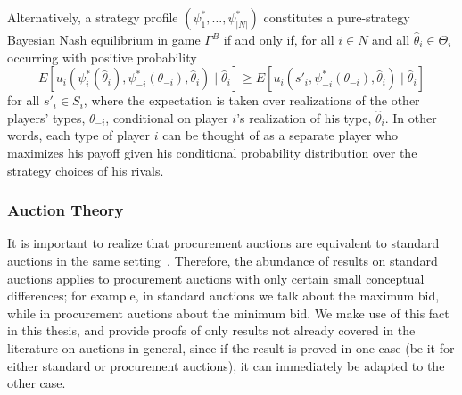 Alternatively, a strategy profile $(\psi_1^*,\ldots,\psi_{|N|}^*)$ constitutes a pure-strategy Bayesian Nash equilibrium in game $\Gamma^B$ if and only if, for all $i\in N$ and all $\hat{\theta}_i\in\Theta_i$ occurring with positive probability
\begin{equation}
	\label{eq:prop_bayesian_nash_eq_notation}
	E[u_i(\psi^*_i(\hat{\theta}_i),\psi^*_{-i}(\theta_{-i}),\hat{\theta}_i)\mid\hat{\theta}_i] \ge
	E[u_i(s'_i,\psi^*_{-i}(\theta_{-i}),\hat{\theta}_i)\mid\hat{\theta}_i]
\end{equation}
for all $s'_i\in S_i$, where the expectation is taken over realizations of the other players' types, $\theta_{-i}$, conditional on player $i$'s realization of his type, $\hat{\theta}_i$. In other words, each type of player $i$ can be thought of as a separate player who maximizes his payoff given his conditional probability distribution over the strategy choices of his rivals.

\subsubsection{Auction Theory} %
\label{ssub:auction_theory_notation}
It is important to realize that procurement auctions are equivalent to standard auctions in the same setting~\cite{Krishna10}. Therefore, the abundance of results on standard auctions applies to procurement auctions with only certain small conceptual differences; for example, in standard auctions we talk about the maximum bid, while in procurement auctions about the minimum bid. We make use of this fact in this thesis, and provide proofs of only results not already covered in the literature on auctions in general, since if the result is proved in one case (be it for either standard or procurement auctions), it can immediately be adapted to the other case.

